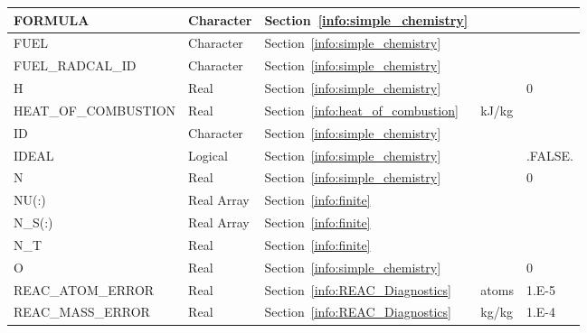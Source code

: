 \documentclass[11pt]{book}
\begin{document}
\begin{longtable}{@{\extracolsep{\fill}}|l|l|l|l|l|}
{\ct FORMULA}                             & Character   & Section~\ref{info:simple_chemistry}       &                   &  \\ \hline
{\ct FUEL}                                & Character   & Section~\ref{info:simple_chemistry}       &                   &   \\ \hline
{\ct FUEL\_RADCAL\_ID}                    & Character   & Section~\ref{info:simple_chemistry}       &                   &       \\ \hline
{\ct H}                                   & Real        & Section~\ref{info:simple_chemistry}       &                   & 0    \\ \hline
{\ct HEAT\_OF\_COMBUSTION}                & Real        & Section~\ref{info:heat_of_combustion}     & kJ/kg             &         \\ \hline
{\ct ID}                                  & Character   & Section~\ref{info:simple_chemistry}       &                   &   \\ \hline
{\ct IDEAL}                               & Logical     & Section~\ref{info:simple_chemistry}       &                   & {\ct .FALSE.}    \\ \hline
{\ct N}                                   & Real        & Section~\ref{info:simple_chemistry}       &                   & 0    \\ \hline
{\ct NU(:)}                               & Real Array  & Section~\ref{info:finite}                 &                   &     \\ \hline
{\ct N\_S(:)}                             & Real Array  & Section~\ref{info:finite}                 &                   &     \\ \hline
{\ct N\_T}                                & Real        & Section~\ref{info:finite}                 &                   &     \\ \hline
{\ct O}                                   & Real        & Section~\ref{info:simple_chemistry}       &                   & 0    \\ \hline
{\ct REAC\_ATOM\_ERROR}                   & Real        & Section~\ref{info:REAC_Diagnostics}       & atoms             & 1.E-5    \\ \hline
{\ct REAC\_MASS\_ERROR}                   & Real        & Section~\ref{info:REAC_Diagnostics}       & kg/kg             & 1.E-4    \\ \hline

\end{longtable}
\end{document}
